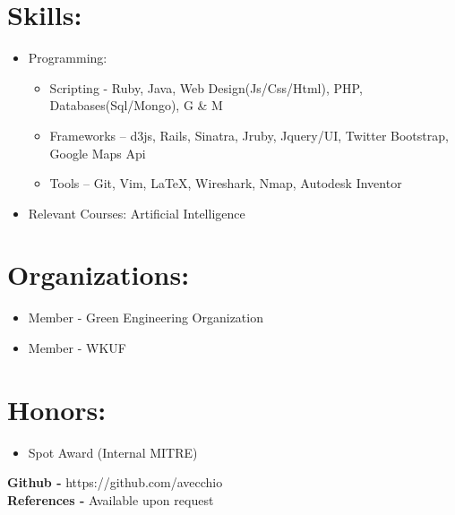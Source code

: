 \documentclass{res}
\begin{document}
\section{Skills:}
\begin{itemize}
\item Programming:
\begin{itemize}[label=$\circ$]
\item Scripting - Ruby, Java, Web Design(Js/Css/Html), PHP, Databases(Sql/Mongo), G \& M
\item Frameworks – d3js, Rails, Sinatra, Jruby, Jquery/UI, Twitter Bootstrap, Google Maps Api
\item Tools – Git, Vim, \LaTeX, Wireshark, Nmap, Autodesk Inventor
\end{itemize}
\item Relevant Courses: Artificial Intelligence
\end{itemize}
\section{Organizations:}
\begin{itemize}
\item Member - Green Engineering Organization
\item Member - WKUF
\end{itemize}

\section{Honors:}
\begin{itemize}
\item Spot Award (Internal MITRE)
\end{itemize}

\begin{center}
\textbf{Github - }https://github.com/avecchio\\
\textbf{References - }Available upon request
\end{center}
\end{document}

